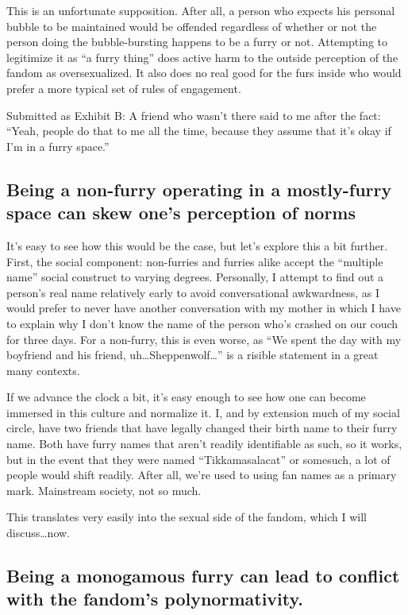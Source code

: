 This is an unfortunate supposition. After all, a person who expects his personal bubble to be maintained would be offended regardless of whether or not the person doing the bubble-bursting happens to be a furry or not. Attempting to legitimize it as ``a furry thing'' does active harm to the outside perception of the fandom as oversexualized. It also does no real good for the furs inside who would prefer a more typical set of rules of engagement.

Submitted as Exhibit B: A friend who wasn't there said to me after the fact: ``Yeah, people do that to me all the time, because they assume that it's okay if I'm in a furry space.''

\subsection*{Being a non-furry operating in a mostly-furry space can skew one's perception of norms}

It's easy to see how this would be the case, but let's explore this a bit further. First, the social component: non-furries and furries alike accept the ``multiple name'' social construct to varying degrees. Personally, I attempt to find out a person's real name relatively early to avoid conversational awkwardness, as I would prefer to never have another conversation with my mother in which I have to explain why I don't know the name of the person who's crashed on our couch for three days. For a non-furry, this is even worse, as ``We spent the day with my boyfriend and his friend, uh\ldots Sheppenwolf\ldots '' is a risible statement in a great many contexts.

If we advance the clock a bit, it's easy enough to see how one can become immersed in this culture and normalize it. I, and by extension much of my social circle, have two friends that have legally changed their birth name to their furry name. Both have furry names that aren't readily identifiable as such, so it works, but in the event that they were named ``Tikkamasalacat'' or somesuch, a lot of people would shift readily. After all, we're used to using fan names as a primary mark. Mainstream society, not so much.

This translates very easily into the sexual side of the fandom, which I will discuss\ldots now.

\subsection*{Being a monogamous furry can lead to conflict with the fandom's polynormativity.}

